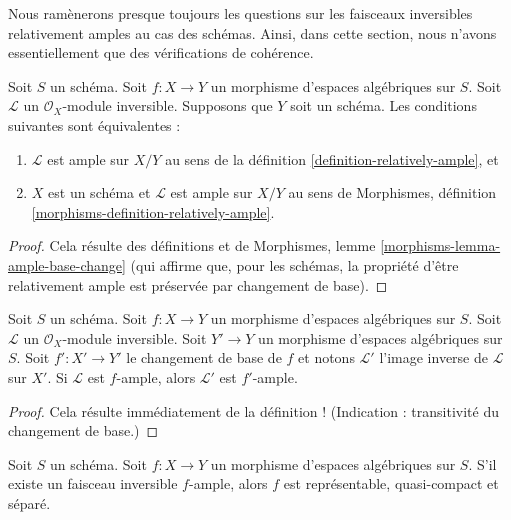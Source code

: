 \noindent
Nous ramènerons presque toujours les questions sur les faisceaux inversibles
relativement amples au cas des schémas. Ainsi, dans cette section, nous n'avons
essentiellement que des vérifications de cohérence.

\begin{lemma}
\label{lemma-relatively-ample-sanity-check}
Soit $S$ un schéma.
Soit $f : X \to Y$ un morphisme d'espaces algébriques sur $S$.
Soit $\mathcal{L}$ un $\mathcal{O}_X$-module inversible.
Supposons que $Y$ soit un schéma. Les conditions suivantes sont équivalentes :
\begin{enumerate}
\item $\mathcal{L}$ est ample sur $X/Y$ au sens de la
définition \ref{definition-relatively-ample}, et
\item $X$ est un schéma et $\mathcal{L}$ est ample sur $X/Y$
au sens de
Morphismes, définition \ref{morphisms-definition-relatively-ample}.
\end{enumerate}
\end{lemma}

\begin{proof}
Cela résulte des définitions et de
Morphismes, lemme \ref{morphisms-lemma-ample-base-change}
(qui affirme que, pour les schémas, la propriété d'être relativement ample
est préservée par changement de base).
\end{proof}

\begin{lemma}
\label{lemma-ample-base-change}
Soit $S$ un schéma.
Soit $f : X \to Y$ un morphisme d'espaces algébriques sur $S$.
Soit $\mathcal{L}$ un $\mathcal{O}_X$-module inversible.
Soit $Y' \to Y$ un morphisme d'espaces algébriques sur $S$.
Soit $f' : X' \to Y'$ le changement de base de $f$ et notons
$\mathcal{L}'$ l'image inverse de $\mathcal{L}$ sur $X'$.
Si $\mathcal{L}$ est $f$-ample, alors $\mathcal{L}'$ est $f'$-ample.
\end{lemma}

\begin{proof}
Cela résulte immédiatement de la définition !
(Indication : transitivité du changement de base.)
\end{proof}

\begin{lemma}
\label{lemma-relatively-ample-properties}
Soit $S$ un schéma.
Soit $f : X \to Y$ un morphisme d'espaces algébriques sur $S$.
S'il existe un faisceau inversible $f$-ample, alors
$f$ est représentable, quasi-compact et séparé.
\end{lemma}

